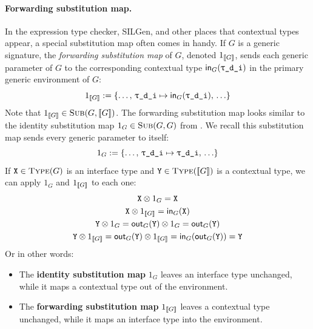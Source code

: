 \documentclass[../generics]{subfiles}
\begin{document}
\paragraph{Forwarding substitution map.} In the expression type checker, SILGen, and other places that contextual types appear, a special substitution map often comes in handy. If $G$ is a generic signature, the \emph{forwarding substitution map} of $G$, denoted $1_{[\![G]\!]}$, sends each generic parameter  of $G$ to the corresponding contextual type $\MapIn(\ttgp{d}{i})$ in the primary generic environment of $G$:
\[\FwdMap{G}:=\{\ldots,\,\ttgp{d}{i}\mapsto\MapIn(\ttgp{d}{i}),\,\ldots\}\]
Note that $1_{[\![G]\!]}\in\textsc{Sub}({G, [\![G]\!]})$. The forwarding substitution map looks similar to the identity substitution map $1_G\in\textsc{Sub}({G, G})$ from . We recall this substitution map sends every generic parameter to itself:
\[1_{G}:=\{\ldots,\,\ttgp{d}{i}\mapsto\ttgp{d}{i},\,\ldots\}\]
If $\texttt{X}\in\textsc{Type}({G})$ is an interface type and $\texttt{Y}\in\textsc{Type}({[\![G]\!]})$ is a contextual type, we can apply $1_G$ and $1_{[\![G]\!]}$ to each one:
\begin{gather*}
\texttt{X}\otimes 1_G=\texttt{X}\\
\texttt{X}\otimes 1_{[\![G]\!]}=\mathsf{in}_G(\texttt{X})\\
\texttt{Y}\otimes 1_G=\mathsf{out}_G(\texttt{Y})\otimes 1_G=\mathsf{out}_G(\texttt{Y})\\
\texttt{Y}\otimes 1_{[\![G]\!]}=\mathsf{out}_G(\texttt{Y})\otimes 1_{[\![G]\!]}=\mathsf{in}_G(\mathsf{out}_G(\texttt{Y}))=\texttt{Y}
\end{gather*}
Or in other words:
\begin{itemize}
\item The \textbf{identity substitution map} $1_G$ leaves an interface type unchanged, while it maps a contextual type out of the environment.
\item The \textbf{forwarding substitution map} $1_{[\![G]\!]}$ leaves a contextual type unchanged, while it maps an interface type into the environment.
\end{itemize}
\end{document}
